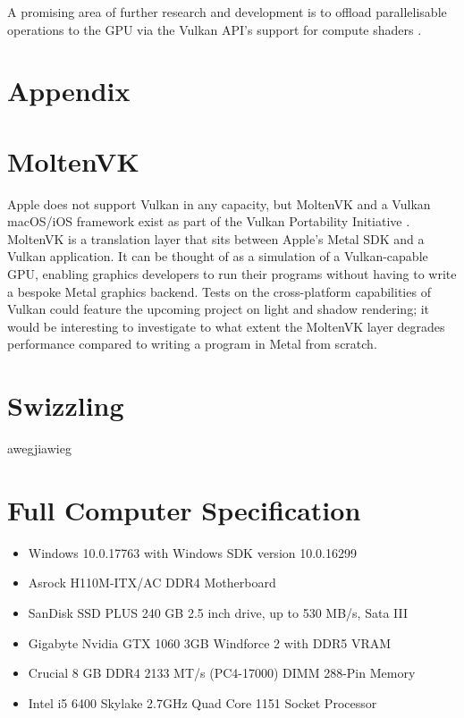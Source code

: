 \documentclass[11pt, a4paper, twocolumn]{article}
\begin{document}
A promising area of further research and development is to offload parallelisable operations to the GPU via the Vulkan API's support for compute shaders \citep{Thomas2014}.






\section*{Appendix}
\appendix

\section{MoltenVK} \label{app:moltenvk}

Apple does not support Vulkan in any capacity, but MoltenVK and a Vulkan macOS/iOS framework exist as part of the Vulkan Portability Initiative \citep{MoltenVK}. MoltenVK is a translation layer that sits between Apple's Metal SDK and a Vulkan application. It can be thought of as a simulation of a Vulkan-capable GPU, enabling graphics developers to run their programs without having to write a bespoke Metal graphics backend. Tests on the cross-platform capabilities of Vulkan could feature the upcoming project on light and shadow rendering; it would be interesting to investigate to what extent the MoltenVK layer degrades performance compared to writing a program in Metal from scratch.

\section{Swizzling} \label{app:swizzle}

awegjiawieg

\section{Full Computer Specification} \label{app:equipment}

\begin{itemize}
\item Windows 10.0.17763 with Windows SDK version 10.0.16299 
\item Asrock H110M-ITX/AC DDR4 Motherboard
\item SanDisk SSD PLUS 240 GB 2.5 inch drive, up to 530 MB/s, Sata III
\item Gigabyte Nvidia GTX 1060 3GB Windforce 2 with DDR5 VRAM
\item Crucial 8 GB DDR4 2133 MT/s (PC4-17000) DIMM 288-Pin Memory
\item Intel i5 6400 Skylake 2.7GHz Quad Core 1151 Socket Processor
\end{itemize}
\end{document}
